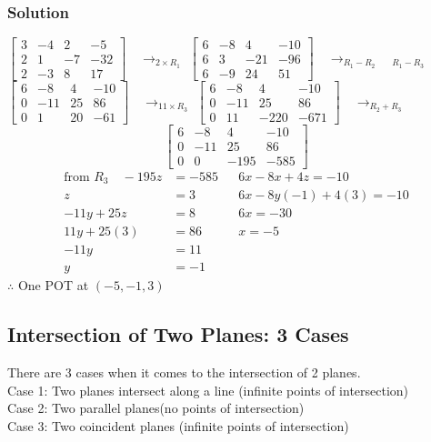 \documentclass{article}
\begin{document}
\subsubsection*{Solution}
$ \left[\begin{array}{lll|l}
3 & -4 & 2 & -5\\
2 & 1 & -7 & -32\\
2 & -3 & 8 & 17
\end{array}\right] \quad \rightarrow_{2 \times R_1}$
$ \left[\begin{array}{lll|l}
6 & -8 & 4 & -10\\
6 & 3 & -21 & -96\\
6 & -9 & 24 & 51
\end{array}\right] \quad \rightarrow_{R_1-R_2 } \quad _{R_1-R_3}$
$ \left[\begin{array}{lll|l}
6 & -8 & 4 & -10\\
0 & -11 & 25 & 86\\
0 & 1 & 20 & -61
\end{array}\right] \quad \rightarrow_{11 \times R_3}$
$ \left[\begin{array}{lll|l}
6 & -8 & 4 & -10\\
0 & -11 & 25 & 86\\
0 & 11 & -220 & -671
\end{array}\right] \quad \rightarrow_{R_2+R_3}$
$$\left[\begin{array}{lll|l}
6 & -8 & 4 & -10\\
0 & -11 & 25 & 86\\
0 & 0 & -195 & -585
\end{array}\right] $$
\begin{align*}
    \text{from } R_3 \quad -195z&=-585 &&6x-8x+4z=-10\\
    z&=3 && 6x-8y(-1)+4(3)=-10\\
    -11y+25z&=8 && 6x=-30\\
    11y+25(3)&=86 && x=-5\\
    -11y&=11 \\
    y&=-1
\end{align*}
$\therefore$ One POT at $(-5,-1,3)$
\subsection{Intersection of Two Planes: 3 Cases}
There are 3 cases when it comes to the intersection of 2 planes. \\
Case 1: Two planes intersect along a line (infinite points of intersection)\\
Case 2: Two parallel planes(no points of intersection)\\
Case 3: Two coincident planes (infinite points of intersection)
\end{document}
